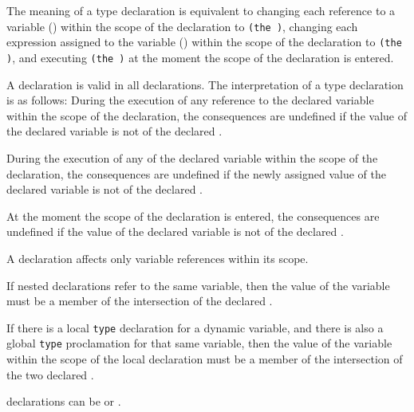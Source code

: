 
The meaning of a type declaration
  is equivalent to changing each reference to 
a variable () within the scope of the
  declaration to {\tt (the  )},
changing each expression assigned to the
  variable () within the scope of the declaration to 
{\tt (the  )},
  and executing 
{\tt (the  )} at the moment the scope of the declaration
  is entered.
 
A  declaration is valid in all declarations. The interpretation
  of a type declaration is as follows:
\beginlist
{} During the execution of any reference to the
  declared variable within the scope of the declaration, the consequences
are 
undefined
if
  the value of the declared variable is not of the declared .

 During the execution of any 
 of the declared variable within the scope
  of the declaration, the consequences are 
undefined
if the newly assigned value of the
  declared variable is not of the declared . 

 At the moment the
  scope of the declaration is entered, the consequences are 
undefined
if the value of the
  declared variable is not of the declared .
\endlist

A  declaration affects only variable references within
its scope.

If nested  declarations refer to the same variable,
  then the value of the variable must be a member of the intersection of
  the declared .

  If there is a local {\tt type} declaration for a dynamic
  variable, and there is also a global {\tt type} proclamation for that same
  variable, then the value of the variable within the scope of the local
  declaration must be a member of the intersection of the two declared
  .
 
 declarations can  be 
or .


